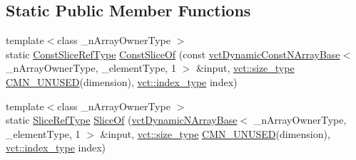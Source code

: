\subsection*{Static Public Member Functions}
\begin{DoxyCompactItemize}
\item 
{\footnotesize template$<$class \-\_\-n\-Array\-Owner\-Type $>$ }\\static \hyperlink{classvct_dynamic_n_array_types_3_011_01_4_1_1_slices_types_a18f8addeaaa816d30b9ed8a7e7dd8f77}{Const\-Slice\-Ref\-Type} \hyperlink{classvct_dynamic_n_array_types_3_011_01_4_1_1_slices_types_a80679736dbde9c53af54d1f1de7c88ac}{Const\-Slice\-Of} (const \hyperlink{classvct_dynamic_const_n_array_base}{vct\-Dynamic\-Const\-N\-Array\-Base}$<$ \-\_\-n\-Array\-Owner\-Type, \-\_\-element\-Type, 1 $>$ \&input, \hyperlink{namespacevct_a3e2935e13aac4500965e00d30565775b}{vct\-::size\-\_\-type} \hyperlink{cmn_portability_8h_a021894e2626935fa2305434b1e893ff6}{C\-M\-N\-\_\-\-U\-N\-U\-S\-E\-D}(dimension), \hyperlink{namespacevct_a50405d87494dce1f22ee3930ca285ee9}{vct\-::index\-\_\-type} index)
\item 
{\footnotesize template$<$class \-\_\-n\-Array\-Owner\-Type $>$ }\\static \hyperlink{classvct_dynamic_n_array_types_3_011_01_4_1_1_slices_types_a34c9917853ea79e85ef0924a9a56a60f}{Slice\-Ref\-Type} \hyperlink{classvct_dynamic_n_array_types_3_011_01_4_1_1_slices_types_ac637db3f80235a25761d4a58663b0f8b}{Slice\-Of} (\hyperlink{classvct_dynamic_n_array_base}{vct\-Dynamic\-N\-Array\-Base}$<$ \-\_\-n\-Array\-Owner\-Type, \-\_\-element\-Type, 1 $>$ \&input, \hyperlink{namespacevct_a3e2935e13aac4500965e00d30565775b}{vct\-::size\-\_\-type} \hyperlink{cmn_portability_8h_a021894e2626935fa2305434b1e893ff6}{C\-M\-N\-\_\-\-U\-N\-U\-S\-E\-D}(dimension), \hyperlink{namespacevct_a50405d87494dce1f22ee3930ca285ee9}{vct\-::index\-\_\-type} index)
\end{DoxyCompactItemize}


